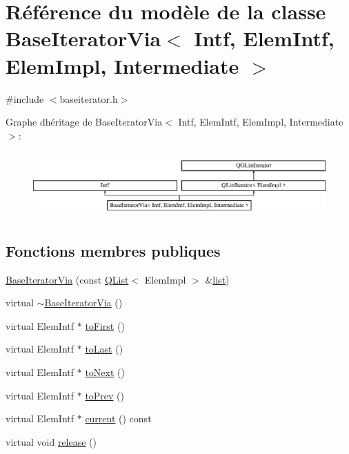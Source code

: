 \hypertarget{class_base_iterator_via}{}\section{Référence du modèle de la classe Base\+Iterator\+Via$<$ Intf, Elem\+Intf, Elem\+Impl, Intermediate $>$}
\label{class_base_iterator_via}


{\ttfamily \#include $<$baseiterator.\+h$>$}

Graphe d\textquotesingle{}héritage de Base\+Iterator\+Via$<$ Intf, Elem\+Intf, Elem\+Impl, Intermediate $>$\+:\begin{figure}[H]
\begin{center}
\leavevmode
\includegraphics[height=2.500000cm]{class_base_iterator_via}
\end{center}
\end{figure}
\subsection*{Fonctions membres publiques}
\begin{DoxyCompactItemize}
\item 
\hyperlink{class_base_iterator_via_a4fc57902e2cb2cc96ef7fcd0dce60143}{Base\+Iterator\+Via} (const \hyperlink{class_q_list}{Q\+List}$<$ Elem\+Impl $>$ \&\hyperlink{class_q_g_list_iterator_a6e606950ab50b273e8370d9e24756bf2}{list})
\item 
virtual \hyperlink{class_base_iterator_via_a1cea7374151ccbe5b3d896b899afef05}{$\sim$\+Base\+Iterator\+Via} ()
\item 
virtual Elem\+Intf $\ast$ \hyperlink{class_base_iterator_via_a6b265cf402c06e641ae54632d0b5ea39}{to\+First} ()
\item 
virtual Elem\+Intf $\ast$ \hyperlink{class_base_iterator_via_a82c4e31c2ba4ce0fb41688e7033912ba}{to\+Last} ()
\item 
virtual Elem\+Intf $\ast$ \hyperlink{class_base_iterator_via_a76f30bdab292aad42afa107a4639ff6d}{to\+Next} ()
\item 
virtual Elem\+Intf $\ast$ \hyperlink{class_base_iterator_via_aa9ceb9f5c11c005581fefa10a52f28f2}{to\+Prev} ()
\item 
virtual Elem\+Intf $\ast$ \hyperlink{class_base_iterator_via_a0a243644e4c983f6e33f13fcd83959fa}{current} () const 
\item 
virtual void \hyperlink{class_base_iterator_via_a1c6a67fe62ee7fa08576e38e358f2e04}{release} ()
\end{DoxyCompactItemize}
